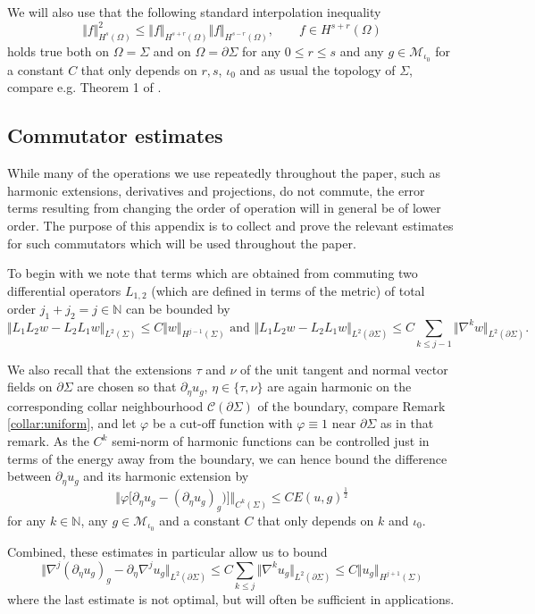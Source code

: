 \documentclass[10pt,reqno]{amsart}
\theoremstyle{plain}
\theoremstyle{definition}
\numberwithin{equation}{section}
\newcommand{\Om}{\Omega}
\newcommand{\Si}{\Sigma}
\newcommand{\N}{\ensuremath{{\mathbb N}}}
\newcommand{\norm}[1]{\Vert#1\Vert}
\newcommand{\beq}{\begin{equation}}
\newcommand{\eeq}{\end{equation}}
\newcommand{\half}{\frac{1}{2}}
\newcommand{\na}{\nabla}
\newcommand{\Col}{\mathcal C}
\newcommand{\pSi}{{\partial \Sigma}}
\newcommand{\MM}{\mathcal{M}} %
\newcommand{\p}{\partial} %
\newcommand{\peta}{\partial_\eta}
\newcommand{\MMiota}{\MM_{\iota_0}}
\begin{document}
We will also use that the following standard interpolation inequality 
\beq \label{app:Hs-interpol}
\norm{f}_{H^s(\Om)}^2\leq \norm{f}_{H^{s+r}(\Om)}\norm{f}_{H^{s-r}(\Om)}, \qquad f\in H^{s+r}(\Om)
\eeq
holds true both on $\Om=\Si$ and on $\Om=\pSi$ for any $0\leq r\leq s$ and any $g\in \MMiota$ for a constant $C$ that only depends on $r,s$, $\iota_0$ and as usual the topology of $\Si$, compare e.g. Theorem 1 of \cite{Brezis_Mironescu_interpolation}.



\subsection{Commutator estimates}\label{sect:app}
While many of the operations we use repeatedly throughout the paper, such as harmonic extensions, derivatives and projections, do not commute, the error terms  resulting from changing the order of operation will in general be of lower order. The purpose of this appendix is to collect and prove the relevant estimates for such commutators which will be used throughout the paper. 

To begin with we note that terms which are obtained from commuting two differential operators $L_{1,2}$ (which are defined in terms of the metric) of total order $j_1+j_2=j\in \N$ can be bounded by 
\beq\label{est:commute-L12}
\norm{L_1L_2 w-L_2L_1 w}_{L^2(\Si)}\leq C \norm{w}_{H^{j-1}(\Si)} \text{ and }
\norm{L_1L_2 w-L_2L_1 w}_{L^2(\pSi)}\leq C \sum_{k\leq j-1}\norm{\na^{k}w}_{L^2(\pSi)}.
\eeq

We also recall that the extensions $\tau$ and $\nu$ of the unit tangent and normal vector fields on $\pSi$ are chosen so that $\peta u_g$, $\eta\in \{\tau,\nu\}$ are again harmonic on the corresponding collar neighbourhood $\Col(\pSi)$ of the boundary, compare Remark \ref{collar:uniform}, and let $\varphi$ be a cut-off function with $\varphi\equiv 1$ near $\pSi$ as in that remark. As the $C^k$ semi-norm of harmonic functions can be controlled just in terms of the energy away from the boundary, we can hence bound the difference between $\peta u_g$ and its harmonic extension by 
\beq\label{est:commute-he-petau}
\norm{\varphi\big[\peta u_g-(\peta u_g)_g)\big]}_{C^k(\Si)}\leq C E(u,g)^\half 
\eeq 
for any $k\in \N$, any $g\in\MMiota$ and a constant $C$ that only depends on $k$ and $\iota_0$. 

Combined, these estimates in particular allow us to bound 
	\begin{equation}\label{est:grad_normal_commute}
		\norm{\nabla^j (\p_{\eta} u_g)_g - \p_{\eta}\nabla^j u_g}_{L^2(\p\Si)} 
        \leq C \sum_{k\leq j}\norm{\na^{k}u_g}_{L^2(\pSi)} \leq 
        C\norm{u_g}_{H^{j+1}(\Si)}
	\end{equation}
where the last estimate is not optimal, but will often be sufficient in applications.
\end{document}
